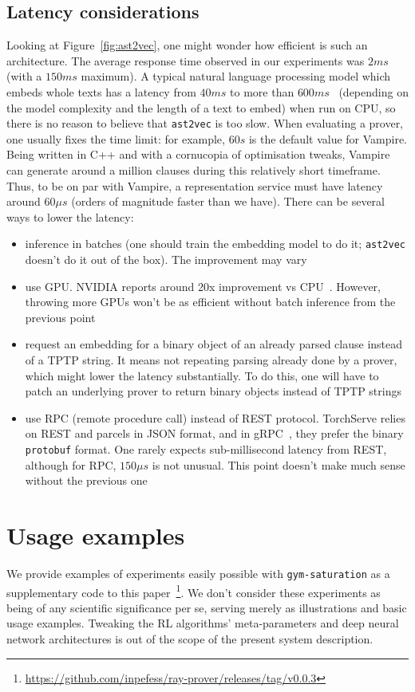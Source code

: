 \documentclass[runningheads]{llncs}
\begin{document}
\subsection{Latency considerations}\label{subsection:latency-considerations}
Looking at Figure~\ref{fig:ast2vec}, one might wonder how efficient is such an architecture. The average response time observed in our experiments was $2ms$ (with a $150ms$ maximum). A typical natural language processing model which embeds whole texts has a latency from $40ms$ to more than $600ms$~\cite{nvidia-blog} (depending on the model complexity and the length of a text to embed) when run on CPU, so there is no reason to believe that \texttt{ast2vec} is too slow. When evaluating a prover, one usually fixes the time limit: for example, $60s$ is the default value for Vampire. Being written in C++ and with a cornucopia of optimisation tweaks, Vampire can generate around a million clauses during this relatively short timeframe. Thus, to be on par with Vampire, a representation service must have latency around $60\mu s$ (orders of magnitude faster than we have). There can be several ways to lower the latency:
\begin{itemize}
\item inference in batches (one should train the embedding model to do it; \texttt{ast2vec} doesn't do it out of the box). The improvement may vary
\item use GPU. NVIDIA reports around 20x improvement vs CPU~\cite{nlu-with-tensorrt-bert}. However, throwing more GPUs won't be as efficient without batch inference from the previous point
\item request an embedding for a binary object of an already parsed clause instead of a TPTP string. It means not repeating parsing already done by a prover, which might lower the latency substantially. To do this, one will have to patch an underlying prover to return binary objects instead of TPTP strings
\item use RPC (remote procedure call) instead of REST protocol. TorchServe relies on REST and parcels in JSON format, and in gRPC~\cite{grpc}, they prefer the binary \texttt{protobuf} format. One rarely expects sub-millisecond latency from REST, although for RPC, $150\mu s$ is not unusual. This point doesn't make much sense without the previous one
\end{itemize}

\section{Usage examples}\label{section:experiments}
We provide examples of experiments easily possible with \texttt{gym-saturation} as a supplementary code to this paper~\footnote{\url{https://github.com/inpefess/ray-prover/releases/tag/v0.0.3}}. We don't consider these experiments as being of any scientific significance per se, serving merely as illustrations and basic usage examples. Tweaking the RL algorithms' meta-parameters and deep neural network architectures is out of the scope of the present system description.
\end{document}
